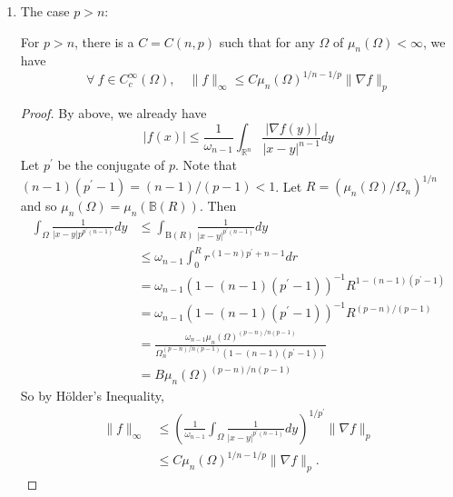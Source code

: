 \begin{enumerate}[label=\Roman*.]
	\item The case $p > n$:
	\begin{thm}
		For $p > n$, there is a $C = C(n,p)$ such that for any $\Omega$ of $\mu_n(\Omega) < \infty$, we have
		\begin{equation*}
			\forall~f \in C_c^\infty(\Omega),\quad \|f\|_{\infty} \leq C \mu_n(\Omega)^{1 / n-1 / p}\|\nabla f\|_p
		\end{equation*}
	\end{thm}
	\begin{proof}
		By above, we already have
		\begin{equation*}
			|f(x)| \leq \frac{1}{\omega_{n-1}} \int_{\mathbb{R}^n} \frac{|\nabla f(y)|}{|x-y|^{n-1}} d y
		\end{equation*}
		Let $p^\prime$ be the conjugate of $p$. Note that $(n-1)\left(p^{\prime}-1\right)=(n-1) /(p-1)<1$. Let $R=\left(\mu_n(\Omega) / \Omega_n\right)^{1 / n}$ and so $\mu_n(\Omega)=\mu_n(\mathbb{B}(R))$. Then
		\begin{equation*}
			\begin{aligned}
				\int_{\Omega} \frac{1}{|x-y| p^{p^{\prime}(n-1)}} d y & \leq \int_{\mathrm{B}(R)} \frac{1}{|x-y|^{p^{\prime}(n-1)}} d y \\
				& \leq \omega_{n-1} \int_0^R r^{(1-n) p^{\prime}+n-1} d r \\
				& =\omega_{n-1}\left(1-(n-1)\left(p^{\prime}-1\right)\right)^{-1} R^{1-(n-1)\left(p^{\prime}-1\right)} \\
				& =\omega_{n-1}\left(1-(n-1)\left(p^{\prime}-1\right)\right)^{-1} R^{(p-n) /(p-1)} \\
				& =\frac{\omega_{n-1} \mu_n(\Omega)^{(p-n) / n(p-1)}}{\Omega_n^{(p-n) / n(p-1)}\left(1-(n-1)\left(p^{\prime}-1\right)\right)} \\
				& =B \mu_n(\Omega)^{(p-n) / n(p-1)}
			\end{aligned}
		\end{equation*}
		So by H\"older's Inequality,
		\begin{equation*}
			\begin{aligned}
				\|f\|_{\infty} & \leq\left(\frac{1}{\omega_{n-1}} \int_{\Omega} \frac{1}{|x-y|^{p^{\prime}(n-1)}} d y\right)^{1 / p^{\prime}}\|\nabla f\|_p \\
				& \leq C \mu_n(\Omega)^{1 / n-1 / p}\|\nabla f\|_p .
			\end{aligned}
		\end{equation*}
	\end{proof}


\end{enumerate}
